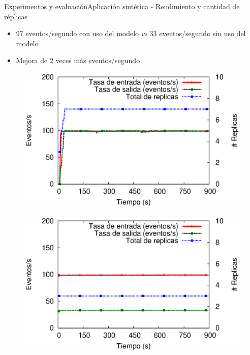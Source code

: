 \begin{frame}{Experimentos y evaluación}{Aplicación sintética - Rendimiento y cantidad de réplicas}

\begin{itemize}
\item 97 eventos/segundo con uso del modelo \textit{vs} 33 eventos/segundo sin uso del modelo
\item Mejora de 2 veces más eventos/segundo
\end{itemize}

\begin{multicols}{2}
\begin{figure}[p]
	\centering
	\includegraphics[scale=0.4]{images/exp/app3/cm/logical/processSystem.eps}
\end{figure}

\begin{figure}[p]
	\centering
	\includegraphics[scale=0.4]{images/exp/app3/sm/logical/processSystem.eps}
\end{figure}
\end{multicols}
\end{frame}


